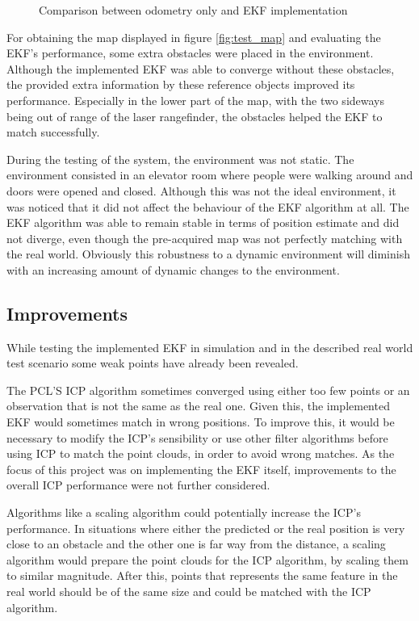 \begin{figure}
	\centering
	\newlength\figureheight 
	\newlength\figurewidth 
	\setlength\figureheight{10cm} 
	\setlength\figurewidth{5cm}
	
      \caption{Comparison between odometry only and EKF implementation}	  
      \label{fig:ekf_odom} 
\end{figure}

For obtaining the map displayed in figure \ref{fig:test_map} and evaluating the EKF's performance, some extra obstacles were placed in the environment. Although the implemented EKF was able to converge without these obstacles, the provided extra information by these reference objects improved its performance. Especially in the lower part of the map, with the two sideways being out of range of the laser rangefinder, the obstacles helped the EKF to match successfully.

During the testing of the system, the environment was not static. The environment consisted in an elevator room where  people were walking around and doors were opened and closed. Although this was not the ideal environment, it was noticed that it did not affect the behaviour of the EKF algorithm at all. The EKF algorithm was able to remain stable in terms of position estimate and did not diverge, even though the pre-acquired map was not perfectly matching with the real world. Obviously this robustness to a dynamic environment will diminish with an increasing amount of dynamic changes to the environment.

\subsection{Improvements}
\label{subsec:Improvemnts}

While testing the implemented EKF in simulation and in the described real world test scenario some weak points have already been revealed.

The PCL'S ICP algorithm sometimes converged using either too few points or an observation that is not the same as the real one. Given this, the implemented EKF would sometimes match in wrong positions. To improve this, it would be necessary to modify the ICP's sensibility or use other filter algorithms before using ICP to match the point clouds, in order to avoid wrong matches. As the focus of this project was on implementing the EKF itself, improvements to the overall ICP performance were not further considered.

Algorithms like a scaling algorithm could potentially increase the ICP's performance. In situations where either the predicted or the real position is very close to an obstacle and the other one is far way from the distance, a scaling algorithm would prepare the point clouds for the ICP algorithm, by scaling them to similar magnitude. After this, points that represents the same feature in the real world should be of the same size and could be matched with the ICP algorithm.

